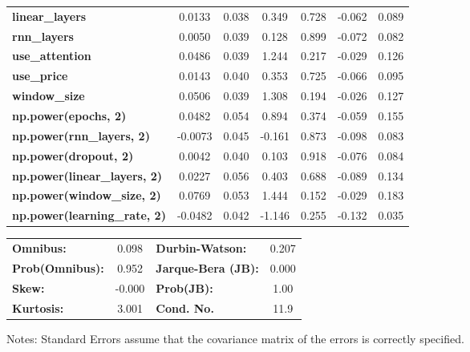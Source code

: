 \begin{center}
\begin{tabular}{lcccccc}
\textbf{linear\_layers}              &       0.0133  &        0.038     &     0.349  &         0.728        &       -0.062    &        0.089     \\
\textbf{rnn\_layers}                 &       0.0050  &        0.039     &     0.128  &         0.899        &       -0.072    &        0.082     \\
\textbf{use\_attention}              &       0.0486  &        0.039     &     1.244  &         0.217        &       -0.029    &        0.126     \\
\textbf{use\_price}                  &       0.0143  &        0.040     &     0.353  &         0.725        &       -0.066    &        0.095     \\
\textbf{window\_size}                &       0.0506  &        0.039     &     1.308  &         0.194        &       -0.026    &        0.127     \\
\textbf{np.power(epochs, 2)}         &       0.0482  &        0.054     &     0.894  &         0.374        &       -0.059    &        0.155     \\
\textbf{np.power(rnn\_layers, 2)}    &      -0.0073  &        0.045     &    -0.161  &         0.873        &       -0.098    &        0.083     \\
\textbf{np.power(dropout, 2)}        &       0.0042  &        0.040     &     0.103  &         0.918        &       -0.076    &        0.084     \\
\textbf{np.power(linear\_layers, 2)} &       0.0227  &        0.056     &     0.403  &         0.688        &       -0.089    &        0.134     \\
\textbf{np.power(window\_size, 2)}   &       0.0769  &        0.053     &     1.444  &         0.152        &       -0.029    &        0.183     \\
\textbf{np.power(learning\_rate, 2)} &      -0.0482  &        0.042     &    -1.146  &         0.255        &       -0.132    &        0.035     \\
\bottomrule
\end{tabular}
\begin{tabular}{lclc}
\textbf{Omnibus:}       &  0.098 & \textbf{  Durbin-Watson:     } &    0.207  \\
\textbf{Prob(Omnibus):} &  0.952 & \textbf{  Jarque-Bera (JB):  } &    0.000  \\
\textbf{Skew:}          & -0.000 & \textbf{  Prob(JB):          } &     1.00  \\
\textbf{Kurtosis:}      &  3.001 & \textbf{  Cond. No.          } &     11.9  \\
\bottomrule
\end{tabular}
\end{center}

Notes: \newline
 [1] Standard Errors assume that the covariance matrix of the errors is correctly specified.